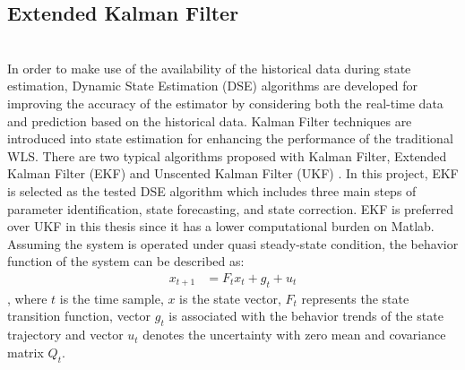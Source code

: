 \subsection{Extended Kalman Filter}
\label{sect:EKF}
\\In order to make use of the availability of the historical data during state estimation, Dynamic State Estimation (DSE) algorithms are developed for improving the accuracy of the estimator by considering both the real-time data and prediction based on the historical data. Kalman Filter techniques are introduced into state estimation for enhancing the performance of the traditional WLS. There are two typical algorithms proposed with Kalman Filter, Extended Kalman Filter (EKF) \cite{jaman2017implementation} and Unscented Kalman Filter (UKF) \cite{valverde2011unscented}. In this project, EKF is selected as the tested DSE algorithm which includes three main steps of parameter identification, state forecasting, and state correction. EKF is preferred over UKF in this thesis since it has a lower computational burden on Matlab.
\bigskip
\\Assuming the system is operated under quasi steady-state condition, the behavior function of the system can be described as:
\begin{align}
    x_{t+1} &= F_t x_t + g_t +u_t
    \label{eq:quasi_steady_state behaviour function}
\end{align}
, where $t$ is the time sample, $x$ is the state vector, $F_t$ represents the state transition function, vector $g_t$ is associated with the behavior trends of the state trajectory and vector $u_t$ denotes the uncertainty with zero mean and covariance matrix $Q_t$.

